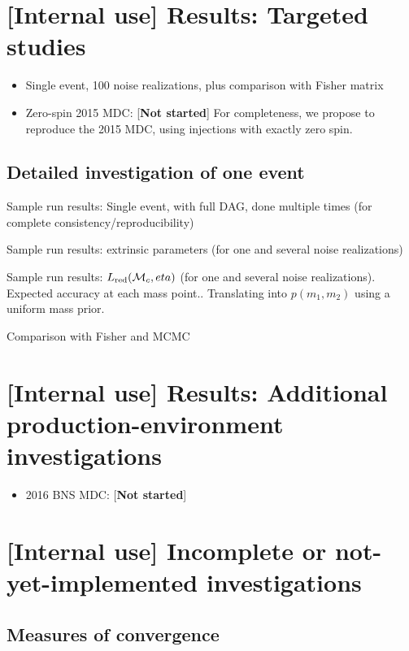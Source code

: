 \section{[Internal use] Results: Targeted studies}

\begin{itemize}
\item Single event, 100 noise realizations, plus comparison with Fisher matrix

\item Zero-spin 2015 MDC: [\textbf{Not started}]  For completeness, we propose to reproduce the 2015 MDC,  using
  injections with exactly zero spin.

\end{itemize}

\subsection{Detailed investigation of one event}
Sample run results: Single event, with full DAG, done multiple times (for complete consistency/reproducibility)

Sample run results: extrinsic parameters (for one and several noise realizations)

Sample run results: $L_{\rm red}({{\cal M}_c},eta)$ (for one and several noise realizations). Expected accuracy at each mass
point.. Translating into  $p(m_1,m_2)$ using a uniform mass prior.

Comparison with Fisher and MCMC



\section{[Internal use] Results: Additional production-environment investigations}

\begin{itemize}
\item 2016 BNS MDC: [\textbf{Not started}]

\end{itemize}

\section{[Internal use] Incomplete or not-yet-implemented investigations}

\subsection{Measures of convergence}

